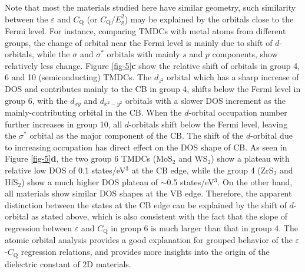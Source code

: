 \documentclass[journal=ancac3,manuscript=article,email=true,hyperref=true,keywords=true]{achemso}
\begin{document}
Note that most the materials studied here have similar geometry, such
similarity between the $\varepsilon$ and $C_{\mathrm{Q}}$ (or
$C_{\mathrm{Q}}/E_{\mathrm{g}}^{2}$) may be explained by the orbitals
close to the Fermi level. For instance, comparing TMDCs with metal
atoms from different groups, the change of orbital near the Fermi
level is mainly due to shift of $d$-orbitals, while the $\sigma$ and
$\sigma^*$ orbitals with mainly $s$ and $p$ components, show relatively
less change\cite{Liang84,Kuc14}. Figure \ref{fig-5}\textbf{c} show the
relative shift of orbitals in group 4, 6 and 10 (semiconducting)
TMDCs. The $d_{z^2}$ orbital which has a sharp increase of DOS and
contributes mainly to the CB in group 4, shifts below the Fermi
level in group 6, with the $d_{xy}$ and $d_{x^2-y^2}$ orbitals
with a slower DOS increment as the mainly-contributing orbital in the
CB. When the $d$-orbital occupation number further increases in group
10, all $d$-orbitals shift below the Fermi level, leaving the
$\sigma^*$ orbital as the major component of the CB. The shift of the
$d$-orbital due to increasing occupation has direct effect on the DOS
shape of CB. As seen in Figure \ref{fig-5}\textbf{d}, the two group 6
TMDCs (MoS$_{2}$ and WS$_{2}$) show a plateau with relative low DOS of
0.1 states/eV$^{3}$ at the CB edge, while the group 4 (ZrS$_{2}$
and HfS$_{2}$) show a much higher DOS plateau of $\sim$0.5 states/eV$^3$. 
On the other hand, all materials show similar DOS
shapes at the VB edge. Therefore, the apparent distinction between the states at the
CB edge can be explained by the shift of $d$-orbital as stated above, which is 
also consistent with the fact that the slope of regression between
$\varepsilon$ and $C_{\mathrm{Q}}$ in group 6 is much larger than that in
group 4. The atomic orbital analysis provides a good explanation for grouped
behavior of the $\varepsilon$-$C_{\mathrm{Q}}$ regression relations, and
provides more insights into the origin of the dielectric constant of
2D materials.
\end{document}
